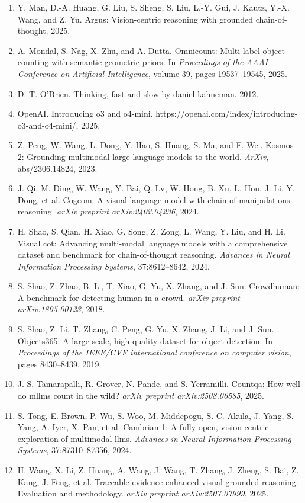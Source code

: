 \documentclass[11pt,a4paper]{article}
\begin{document}
\begin{enumerate}
    \item Y. Man, D.-A. Huang, G. Liu, S. Sheng, S. Liu, L.-Y. Gui, J. Kautz, Y.-X. Wang, and Z. Yu. Argus: Vision-centric reasoning with grounded chain-of-thought. 2025.
    \item A. Mondal, S. Nag, X. Zhu, and A. Dutta. Omnicount: Multi-label object counting with semantic-geometric priors. In \textit{Proceedings of the AAAI Conference on Artificial Intelligence}, volume 39, pages 19537–19545, 2025.
    \item D. T. O'Brien. Thinking, fast and slow by daniel kahneman. 2012.
    \item OpenAI. Introducing o3 and o4-mini. https://openai.com/index/introducing-o3-and-o4-mini/, 2025.
    \item Z. Peng, W. Wang, L. Dong, Y. Hao, S. Huang, S. Ma, and F. Wei. Kosmos-2: Grounding multimodal large language models to the world. \textit{ArXiv}, abs/2306.14824, 2023.
    \item J. Qi, M. Ding, W. Wang, Y. Bai, Q. Lv, W. Hong, B. Xu, L. Hou, J. Li, Y. Dong, et al. Cogcom: A visual language model with chain-of-manipulations reasoning. \textit{arXiv preprint arXiv:2402.04236}, 2024.
    \item H. Shao, S. Qian, H. Xiao, G. Song, Z. Zong, L. Wang, Y. Liu, and H. Li. Visual cot: Advancing multi-modal language models with a comprehensive dataset and benchmark for chain-of-thought reasoning. \textit{Advances in Neural Information Processing Systems}, 37:8612–8642, 2024.
    \item S. Shao, Z. Zhao, B. Li, T. Xiao, G. Yu, X. Zhang, and J. Sun. Crowdhuman: A benchmark for detecting human in a crowd. \textit{arXiv preprint arXiv:1805.00123}, 2018.
    \item S. Shao, Z. Li, T. Zhang, C. Peng, G. Yu, X. Zhang, J. Li, and J. Sun. Objects365: A large-scale, high-quality dataset for object detection. In \textit{Proceedings of the IEEE/CVF international conference on computer vision}, pages 8430–8439, 2019.
    \item J. S. Tamarapalli, R. Grover, N. Pande, and S. Yerramilli. Countqa: How well do mllms count in the wild? \textit{arXiv preprint arXiv:2508.06585}, 2025.
    \item S. Tong, E. Brown, P. Wu, S. Woo, M. Middepogu, S. C. Akula, J. Yang, S. Yang, A. Iyer, X. Pan, et al. Cambrian-1: A fully open, vision-centric exploration of multimodal llms. \textit{Advances in Neural Information Processing Systems}, 37:87310–87356, 2024.
    \item H. Wang, X. Li, Z. Huang, A. Wang, J. Wang, T. Zhang, J. Zheng, S. Bai, Z. Kang, J. Feng, et al. Traceable evidence enhanced visual grounded reasoning: Evaluation and methodology. \textit{arXiv preprint arXiv:2507.07999}, 2025.

\end{enumerate}
\end{document}
